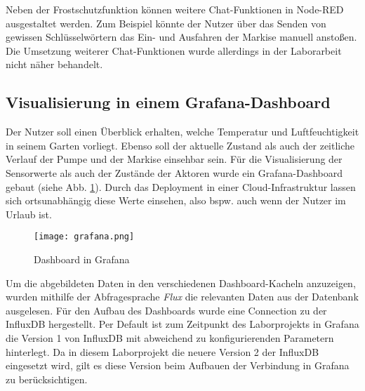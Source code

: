 Neben der Frostschutzfunktion können weitere Chat-Funktionen in Node-RED ausgestaltet werden. Zum Beispiel könnte der Nutzer über das Senden von gewissen Schlüsselwörtern das Ein- und Ausfahren der Markise manuell anstoßen. Die Umsetzung weiterer Chat-Funktionen wurde allerdings in der Laborarbeit nicht näher behandelt.

\subsection{Visualisierung in einem Grafana-Dashboard}

Der Nutzer soll einen Überblick erhalten, welche Temperatur und Luftfeuchtigkeit in seinem Garten vorliegt. Ebenso soll der aktuelle Zustand als auch der zeitliche Verlauf der Pumpe und der Markise einsehbar sein.
Für die Visualisierung der Sensorwerte als auch der Zustände der Aktoren wurde ein Grafana-Dashboard gebaut (siehe Abb. \ref{fig:grafana}). Durch das Deployment in einer Cloud-Infrastruktur lassen sich ortsunabhängig diese Werte einsehen, also bspw. auch wenn der Nutzer im Urlaub ist.

\begin{figure}[h]
  \centering
  \texttt{[image: grafana.png]}
  \caption{Dashboard in Grafana}\label{fig:grafana}
\end{figure}

Um die abgebildeten Daten in den verschiedenen Dashboard-Kacheln anzuzeigen, wurden mithilfe der Abfragesprache \textit{Flux} die relevanten Daten aus der Datenbank ausgelesen. 
Für den Aufbau des Dashboards wurde eine Connection zu der InfluxDB hergestellt. Per Default ist zum Zeitpunkt des Laborprojekts in Grafana die Version 1 von InfluxDB mit abweichend zu konfigurierenden Parametern hinterlegt. Da in diesem Laborprojekt die neuere Version 2 der InfluxDB eingesetzt wird, gilt es diese Version beim Aufbauen der Verbindung in Grafana zu berücksichtigen. 



